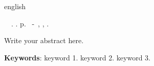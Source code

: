 \begin{resumo}[Abstract]
 \begin{otherlanguage*}{english}
	\begin{flushleft} 
		\setlength{\absparsep}{0pt}		
 		\SingleSpacing  		\imprimirautorabr~~\textbf{\imprimirtitleabstract}.	\imprimirdata.  \pageref{LastPage} p. 
		\imprimirtipotrabalhoabs~-~\imprimirinstituicao, \imprimirlocal, 	\imprimirdata. 
 	\end{flushleft}
	\OnehalfSpacing 
   Write your abstract here.

   \vspace{\onelineskip}
 
   \noindent 
   \textbf{Keywords}: keyword 1. keyword 2. keyword 3. 
 \end{otherlanguage*}
\end{resumo}
